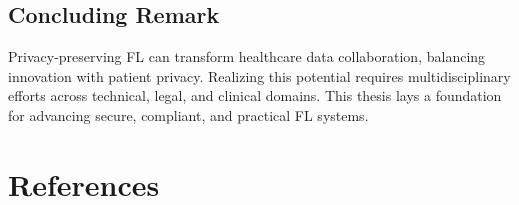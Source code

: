 \documentclass[12pt]{report}
\begin{document}
\section{Concluding Remark}
Privacy-preserving FL can transform healthcare data collaboration, balancing innovation with patient privacy. Realizing this potential requires multidisciplinary efforts across technical, legal, and clinical domains. This thesis lays a foundation for advancing secure, compliant, and practical FL systems.

\chapter*{References}


\end{document}
